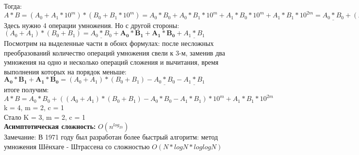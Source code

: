 \documentclass[a4paper,12pt]{article}
\begin{document}
Тогда: $A * B = ( A_0 + A_1 * 10^m ) * ( B_0 + B_1 * 10^m ) = A_0 * B_0 + A_0 * B_1 * 10^m + A_1 * B_0 * 10^m + A_1 * B_1 * 10^{2m} = \underline{A_0 * B_0} + \mathbf{( A_0 * B_1 + A_1 * B_0 )} * 10^m + A_1 * B_1 * 10^{2m}$\\

Здесь нужно 4 операции умножения. Но с другой стороны:\\
$( A_0 + A_1 ) * ( B_0 + B_1 ) = \underline{A_0 * B_0} + \mathbf{A_0 * B_1 + A_1 * B_0} + \underline{A_1 * B_1}$\\

Посмотрим на выделенные части в обоих формулах: после несложных преобразований количество операций умножения свели к 3-м, заменив два умножения на одно и несколько операций сложения и вычитания, время выполнения которых на порядок меньше:\\
$\mathbf{A_0 * B_1 + A_1 * B_0} = ( A_0 + A_1 ) * ( B_0 + B_1 ) - \underline{A_0 * B_0} - \underline{A_1 * B_1}$\\

 итоге получим:
$A * B = A_0 * B_0 + (( A_0 + A_1 ) * ( B_0 + B_1 ) - A_0 * B_0 - A_1 * B_1 ) *10^m + A_1 * B_1 * 10^{2m} $\\

 k = 4, m = 2, c = 1\\
Стало K = 3, m = 2, c = 1\\

\textbf{Асимптотическая сложность:} $O(n^{log_23})$\\

Замечание: В 1971 году был разработан более быстрый алгоритм: метод умножения Шёнхаге - Штрассена со сложностью $O(N*logN*loglogN)$
\end{document}
